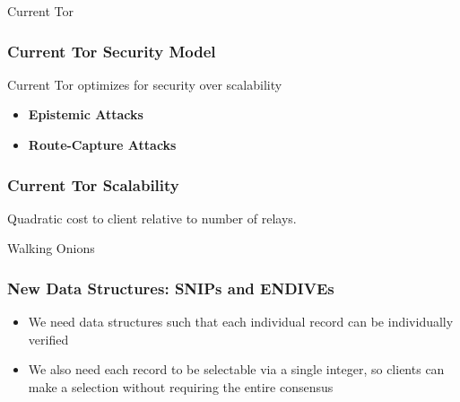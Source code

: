 \documentclass[hyperref={pdfpagelabels=true},table,dvipsnames,14pt,aspectratio=169]{beamer}
\begin{document}
\begin{frame}
  \centering
  \huge
  Current Tor
\end{frame}

\begin{frame}
\frametitle{Current Tor Security Model}

Current Tor optimizes for security over scalability

  \begin{itemize}
    \item \textbf{Epistemic Attacks}
    \item \textbf{Route-Capture Attacks}
  \end{itemize}

\end{frame}

\begin{frame}
\frametitle{Current Tor Scalability}

Quadratic cost to client relative to number of relays.

\end{frame}

\begin{frame}
  \centering
  \huge
  Walking Onions
\end{frame}

\begin{frame}
\frametitle{New Data Structures: SNIPs and ENDIVEs}
  \begin{itemize}
    \item We need data structures such that each individual record can be
      individually verified
    \item We also need each record to be selectable via a single integer, so
      clients can make a selection without requiring the entire consensus
  \end{itemize}
\end{frame}
\end{document}
